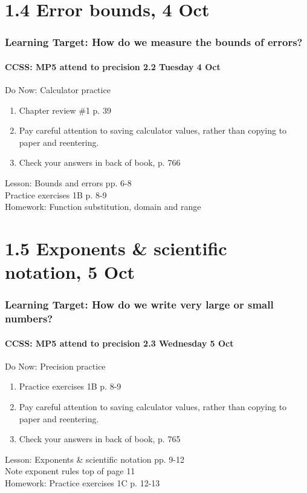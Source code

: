 \documentclass{beamer}
\begin{document}
  \section{1.4 Error bounds, 4 Oct}
  \frame
  {
    \frametitle{Learning Target: How do we measure the bounds of errors?}
    \framesubtitle{CCSS: MP5 attend to precision \hfill \alert{2.2 Tuesday 4 Oct}}

    \begin{block}{Do Now: Calculator practice}
    \begin{enumerate}
        \item Chapter review \#1 p. 39
        \item Pay careful attention to saving calculator values, rather than copying to paper and reentering.
        \item Check your answers in back of book, p. 766
    \end{enumerate}
    \end{block}
    Lesson: Bounds and errors pp. 6-8\\ \bigskip
    Practice exercises 1B p. 8-9\\
    Homework: Function substitution, domain and range
  }

  \section{1.5 Exponents \& scientific notation, 5 Oct}
  \frame
  {
    \frametitle{Learning Target: How do we write very large or small numbers?}
    \framesubtitle{CCSS: MP5 attend to precision \hfill \alert{2.3 Wednesday 5 Oct}}

    \begin{block}{Do Now: Precision practice}
    \begin{enumerate}
        \item Practice exercises 1B p. 8-9
        \item Pay careful attention to saving calculator values, rather than copying to paper and reentering.
        \item Check your answers in back of book, p. 765
    \end{enumerate}
    \end{block}
    Lesson: Exponents \& scientific notation pp. 9-12\\ \smallskip
    Note exponent rules top of page 11\\ \smallskip
    Homework: Practice exercises 1C p. 12-13
  }
\end{document}
